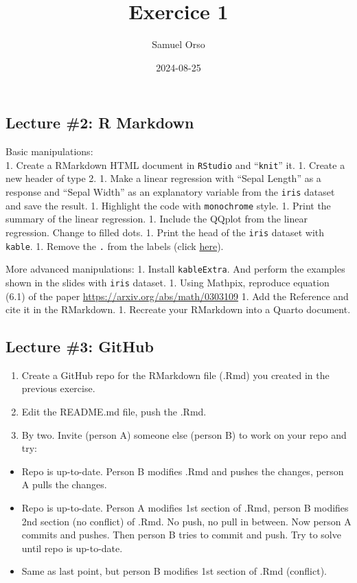 \documentclass[
]{article}
\title{Exercice 1}
\author{Samuel Orso}
\date{2024-08-25}
\providecommand{\tightlist}{%
  \setlength{\itemsep}{0pt}\setlength{\parskip}{0pt}}
\begin{document}
\maketitle

\hypertarget{lecture-2-r-markdown}{%
\subsection{Lecture \#2: R Markdown}\label{lecture-2-r-markdown}}

Basic manipulations:\\
1. Create a RMarkdown HTML document in \texttt{RStudio} and
``\texttt{knit}'' it. 1. Create a new header of type 2. 1. Make a linear
regression with ``Sepal Length'' as a response and ``Sepal Width'' as an
explanatory variable from the \texttt{iris} dataset and save the result.
1. Highlight the code with \texttt{monochrome} style. 1. Print the
summary of the linear regression. 1. Include the QQplot from the linear
regression. Change to filled dots. 1. Print the head of the
\texttt{iris} dataset with \texttt{kable}. 1. Remove the \texttt{.} from
the labels (click
\href{https://bookdown.org/yihui/rmarkdown-cookbook/kable.html\#change-column-names}{here}).

More advanced manipulations: 1. Install \texttt{kableExtra}. And perform
the examples shown in the slides with \texttt{iris} dataset. 1. Using
Mathpix, reproduce equation (6.1) of the paper
\url{https://arxiv.org/abs/math/0303109} 1. Add the Reference and cite
it in the RMarkdown. 1. Recreate your RMarkdown into a Quarto document.

\hypertarget{lecture-3-github}{%
\subsection{Lecture \#3: GitHub}\label{lecture-3-github}}

\begin{enumerate}
\def\labelenumi{\arabic{enumi}.}
\tightlist
\item
  Create a GitHub repo for the RMarkdown file (.Rmd) you created in the
  previous exercise.
\item
  Edit the README.md file, push the .Rmd.
\item
  By two. Invite (person A) someone else (person B) to work on your repo
  and try:
\end{enumerate}

\begin{itemize}
\tightlist
\item
  Repo is up-to-date. Person B modifies .Rmd and pushes the changes,
  person A pulls the changes.
\item
  Repo is up-to-date. Person A modifies 1st section of .Rmd, person B
  modifies 2nd section (no conflict) of .Rmd. No push, no pull in
  between. Now person A commits and pushes. Then person B tries to
  commit and push. Try to solve until repo is up-to-date.
\item
  Same as last point, but person B modifies 1st section of .Rmd
  (conflict).
\end{itemize}
\end{document}
